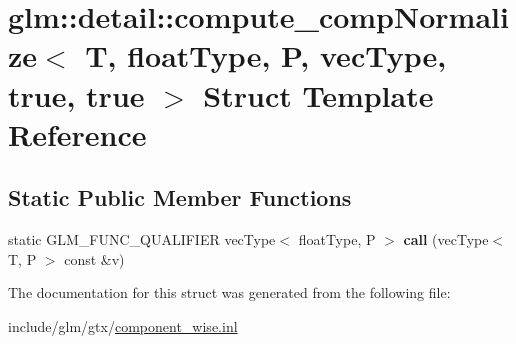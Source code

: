 \hypertarget{structglm_1_1detail_1_1compute__compNormalize_3_01T_00_01floatType_00_01P_00_01vecType_00_01true_00_01true_01_4}{}\section{glm\+:\+:detail\+:\+:compute\+\_\+comp\+Normalize$<$ T, float\+Type, P, vec\+Type, true, true $>$ Struct Template Reference}
\label{structglm_1_1detail_1_1compute__compNormalize_3_01T_00_01floatType_00_01P_00_01vecType_00_01true_00_01true_01_4}
\subsection*{Static Public Member Functions}
\begin{DoxyCompactItemize}
\item 
\mbox{\label{structglm_1_1detail_1_1compute__compNormalize_3_01T_00_01floatType_00_01P_00_01vecType_00_01true_00_01true_01_4_ac66a98ef82bfc3fa7c62fb6d9eaf5f46}} 
static G\+L\+M\+\_\+\+F\+U\+N\+C\+\_\+\+Q\+U\+A\+L\+I\+F\+I\+ER vec\+Type$<$ float\+Type, P $>$ {\bfseries call} (vec\+Type$<$ T, P $>$ const \&v)
\end{DoxyCompactItemize}


The documentation for this struct was generated from the following file\+:\begin{DoxyCompactItemize}
\item 
include/glm/gtx/\hyperlink{component__wise_8inl}{component\+\_\+wise.\+inl}\end{DoxyCompactItemize}
